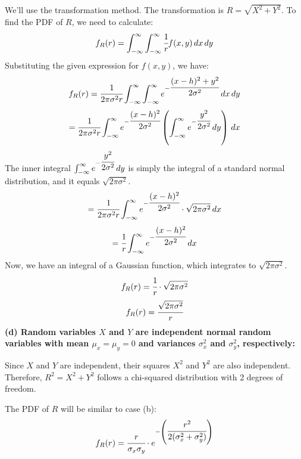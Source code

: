 \documentclass{article}
\begin{document}
\begin{enumerate}
    We'll use the transformation method. The transformation is \( R = \sqrt{X^2 + Y^2} \). To find the PDF of \( R \), we need to calculate:
    \[ 
        f_R(r) = \int_{-\infty}^{\infty} \int_{-\infty}^{\infty} \cfrac{1}{r} f(x, y) \,dx \,dy 
    \]
    Substituting the given expression for \( f(x, y) \), we have:
    \[ 
        f_R(r) = \cfrac{1}{2\pi\sigma^2r} \int_{-\infty}^{\infty} \int_{-\infty}^{\infty} e^{-\cfrac{(x - h)^2 + y^2}{2\sigma^2}} \,dx \,dy 
    \]
    \[ 
        = \cfrac{1}{2\pi\sigma^2r} \int_{-\infty}^{\infty} e^{-\cfrac{(x - h)^2}{2\sigma^2}} \left( \int_{-\infty}^{\infty} e^{-\cfrac{y^2}{2\sigma^2}} \,dy \right) \,dx 
    \]
    The inner integral \( \int_{-\infty}^{\infty} e^{-\cfrac{y^2}{2\sigma^2}} \,dy \) is simply the integral of a standard normal distribution, and it equals \( \sqrt{2\pi\sigma^2} \).
    \[ 
        = \cfrac{1}{2\pi\sigma^2r} \int_{-\infty}^{\infty} e^{-\cfrac{(x - h)^2}{2\sigma^2}} \cdot \sqrt{2\pi\sigma^2} \,dx
    \]
    \[ 
        = \cfrac{1}{r} \int_{-\infty}^{\infty} e^{-\cfrac{(x - h)^2}{2\sigma^2}} \,dx
    \]
    Now, we have an integral of a Gaussian function, which integrates to \( \sqrt{2\pi\sigma^2} \).
    \[ 
        f_R(r) = \cfrac{1}{r} \cdot \sqrt{2\pi\sigma^2} 
    \]
    \[ 
        f_R(r) = \cfrac{\sqrt{2\pi\sigma^2}}{r}
    \]
    \textbf{(d) Random variables $X$ and $Y$ are independent normal random variables with mean $\mu_x = \mu_y = 0$ and variances $\sigma_x^2$ and $\sigma_y^2$, respectively:}

    Since $X$ and $Y$ are independent, their squares $X^2$ and $Y^2$ are also independent. Therefore, $R^2 = X^2 + Y^2$ follows a chi-squared distribution with 2 degrees of freedom.

    The PDF of $R$ will be similar to case (b):
    \[ 
        f_R(r) = \cfrac{r}{\sigma_x \sigma_y}\cdot e^{-\left(\cfrac{r^2}{2(\sigma_x^2 + \sigma_y^2)}\right)}
    \]


\end{enumerate}
\end{document}
